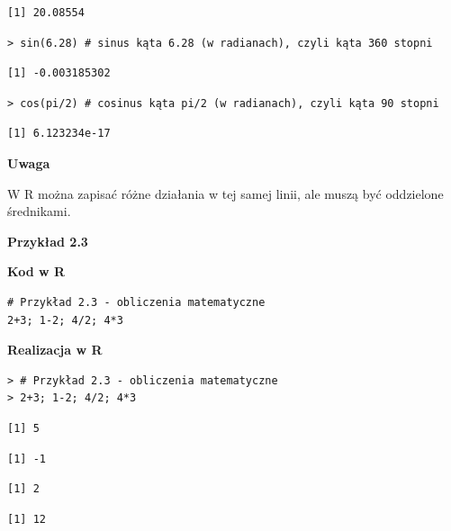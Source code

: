 \documentclass[12pt,B5paper,]{book}
\begin{document}
\begin{verbatim}
[1] 20.08554
\end{verbatim}

\begin{verbatim}
> sin(6.28) # sinus kąta 6.28 (w radianach), czyli kąta 360 stopni
\end{verbatim}

\begin{verbatim}
[1] -0.003185302
\end{verbatim}

\begin{verbatim}
> cos(pi/2) # cosinus kąta pi/2 (w radianach), czyli kąta 90 stopni
\end{verbatim}

\begin{verbatim}
[1] 6.123234e-17
\end{verbatim}

\vspace{0.8cm}

\textbf{Uwaga}

W R można zapisać różne działania w tej samej linii, ale muszą być
oddzielone średnikami.

\vspace{0.8cm}

\textbf{Przykład 2.3}

\textbf{Kod w R}

\begin{verbatim}
# Przykład 2.3 - obliczenia matematyczne
2+3; 1-2; 4/2; 4*3
\end{verbatim}

\vspace{0.8cm}

\textbf{Realizacja w R}

\begin{verbatim}
> # Przykład 2.3 - obliczenia matematyczne
> 2+3; 1-2; 4/2; 4*3
\end{verbatim}

\begin{verbatim}
[1] 5
\end{verbatim}

\begin{verbatim}
[1] -1
\end{verbatim}

\begin{verbatim}
[1] 2
\end{verbatim}

\begin{verbatim}
[1] 12
\end{verbatim}
\end{document}
